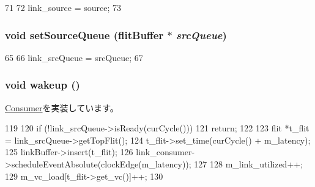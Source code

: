\begin{DoxyCode}
71 {
72     link_source = source;
73 }
\end{DoxyCode}
\hypertarget{classNetworkLink_a6897db68790663c5701e8d845e50c570}{
\subsubsection[{setSourceQueue}]{\setlength{\rightskip}{0pt plus 5cm}void setSourceQueue ({\bf flitBuffer} $\ast$ {\em srcQueue})}}
\label{classNetworkLink_a6897db68790663c5701e8d845e50c570}



\begin{DoxyCode}
65 {
66     link_srcQueue = srcQueue;
67 }
\end{DoxyCode}
\hypertarget{classNetworkLink_ae674290a26ecbd622c5160e38e8a4fe9}{
\subsubsection[{wakeup}]{\setlength{\rightskip}{0pt plus 5cm}void wakeup ()}}
\label{classNetworkLink_ae674290a26ecbd622c5160e38e8a4fe9}


\hyperlink{classConsumer_a623e3e7d1b1c725d70009f7b01a421b9}{Consumer}を実装しています。


\begin{DoxyCode}
119 {
120     if (!link_srcQueue->isReady(curCycle()))
121         return;
122 
123     flit *t_flit = link_srcQueue->getTopFlit();
124     t_flit->set_time(curCycle() + m_latency);
125     linkBuffer->insert(t_flit);
126     link_consumer->scheduleEventAbsolute(clockEdge(m_latency));
127 
128     m_link_utilized++;
129     m_vc_load[t_flit->get_vc()]++;
130 }
\end{DoxyCode}


